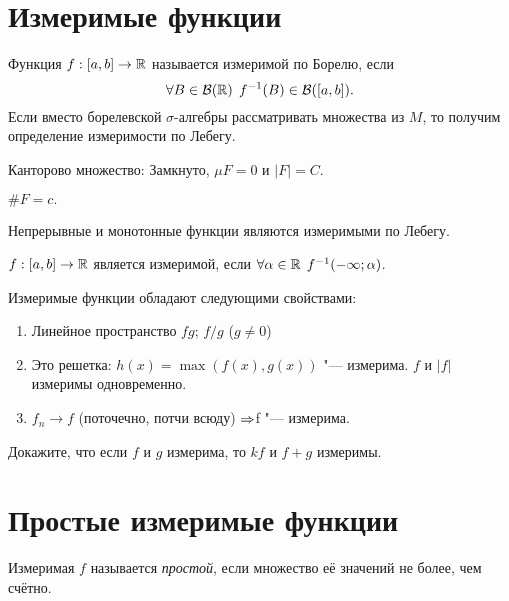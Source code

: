 \documentclass[main]{subfiles}
\begin{document}
\section{Измеримые функции}

\begin{definition}
  Функция $f : [a, b] \to \mathbb{R}$ называется измеримой по Борелю, если
  \[ \forall {B \in \mathcal{B}(\mathbb{R})} \; \, f^{-1}(B) \in \mathcal{B}([a, b]). \]
  Если вместо борелевской $\sigma$-алгебры рассматривать множества из $M$,
  то получим определение измеримости по Лебегу.
\end{definition}

Канторово множество:
Замкнуто, $\mu F = 0$ и $|F| = C$.

\begin{exercise}
  $ \# F = c. $
\end{exercise}

\begin{exercise}
  Непрерывные и монотонные функции являются измеримыми по Лебегу.
\end{exercise}

\begin{definition}
  $f : [a, b] \to \mathbb{R}$ является измеримой, если
  $\forall {\alpha \in \mathbb{R}} \; \, f^{-1}(-\infty; \alpha)$.
\end{definition}

\begin{theorem}
  Измеримые функции обладают следующими свойствами:
  \begin{enumerate}
    \item Линейное пространство $f g$; $f / g$ ($g \ne 0$)
    \item Это решетка:
      $h(x) = \max(f(x), g(x))$ "--- измерима.
      $f$ и $|f|$ измеримы одновременно.
    \item $f_n \to f$ (поточечно, потчи всюду) $\Rightarrow $f "--- измерима.
  \end{enumerate}
\end{theorem}

\begin{exercise}
  Докажите, что если $f$ и $g$ измерима, то
  $k f$ и $f + g$ измеримы.
\end{exercise}

\section{Простые измеримые функции}

\begin{definition}
  Измеримая $f$ называется \emph{простой}, если множество её
  значений не более, чем счётно.
\end{definition}
\end{document}
